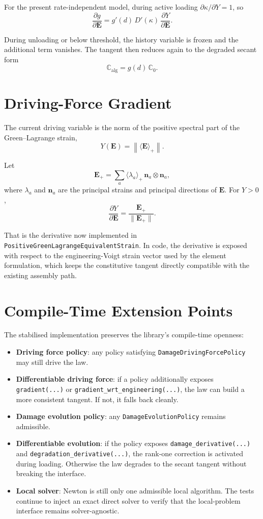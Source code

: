 For the present rate-independent model, during active loading
$\partial \kappa / \partial Y = 1$, so
\[
  \frac{\partial g}{\partial \mathbf{E}}
  =
  g'(d)\,D'(\kappa)\,\frac{\partial Y}{\partial \mathbf{E}}.
\]

During unloading or below threshold, the history variable is frozen and the
additional term vanishes.  The tangent then reduces again to the degraded
secant form
\[
  \mathbb{C}_{\text{alg}} = g(d)\,\mathbb{C}_0.
\]

\section{Driving-Force Gradient}

The current driving variable is the norm of the positive spectral part of the
Green--Lagrange strain,
\[
  Y(\mathbf{E}) = \left\lVert \langle \mathbf{E} \rangle_+ \right\rVert.
\]

Let
\[
  \mathbf{E}_+ = \sum_a \langle \lambda_a \rangle_+ \,\mathbf{n}_a \otimes
  \mathbf{n}_a,
\]
where $\lambda_a$ and $\mathbf{n}_a$ are the principal strains and principal
directions of $\mathbf{E}$.  For $Y > 0$,
\[
  \frac{\partial Y}{\partial \mathbf{E}}
  =
  \frac{\mathbf{E}_+}{\lVert \mathbf{E}_+ \rVert}.
\]

That is the derivative now implemented in
\texttt{PositiveGreenLagrangeEquivalentStrain}.  In code, the derivative is
exposed with respect to the engineering-Voigt strain vector used by the
element formulation, which keeps the constitutive tangent directly compatible
with the existing assembly path.

\section{Compile-Time Extension Points}

The stabilised implementation preserves the library's compile-time openness:
\begin{itemize}
  \item \textbf{Driving force policy}: any policy satisfying
        \texttt{DamageDrivingForcePolicy} may still drive the law.
  \item \textbf{Differentiable driving force}: if a policy additionally
        exposes \texttt{gradient(...)} or
        \texttt{gradient\_wrt\_engineering(...)}, the law can build a more
        consistent tangent.  If not, it falls back cleanly.
  \item \textbf{Damage evolution policy}: any
        \texttt{DamageEvolutionPolicy} remains admissible.
  \item \textbf{Differentiable evolution}: if the policy exposes
        \texttt{damage\_derivative(...)} and
        \texttt{degradation\_derivative(...)}, the rank-one correction is
        activated during loading.  Otherwise the law degrades to the secant
        tangent without breaking the interface.
  \item \textbf{Local solver}: Newton is still only one admissible local
        algorithm.  The tests continue to inject an exact direct solver to
        verify that the local-problem interface remains solver-agnostic.
\end{itemize}

